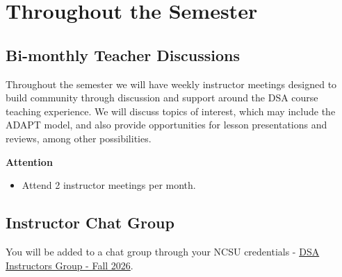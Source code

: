 \documentclass[
  letterpaper,
  DIV=11,
  numbers=noendperiod]{scrreprt}
\providecommand{\tightlist}{%
  \setlength{\itemsep}{0pt}\setlength{\parskip}{0pt}}
\begin{document}
\section{Throughout the Semester}\label{throughout-the-semester}

\subsection{Bi-monthly Teacher
Discussions}\label{bi-monthly-teacher-discussions}

Throughout the semester we will have weekly instructor meetings designed
to build community through discussion and support around the DSA course
teaching experience. We will discuss topics of interest, which may
include the ADAPT model, and also provide opportunities for lesson
presentations and reviews, among other possibilities.

\begin{tcolorbox}[enhanced jigsaw, toprule=.15mm, colback=white, arc=.35mm, colframe=quarto-callout-note-color-frame, bottomrule=.15mm, rightrule=.15mm, breakable, leftrule=.75mm, left=2mm, opacityback=0]
\begin{minipage}[t]{5.5mm}
\textcolor{quarto-callout-note-color}{\faInfo}
\end{minipage}%
\begin{minipage}[t]{\textwidth - 5.5mm}

\vspace{-3mm}\textbf{{Attention}}\vspace{3mm}

\begin{itemize}
\tightlist
\item
  {Attend 2 instructor meetings per month.}
\end{itemize}

\end{minipage}%
\end{tcolorbox}

\subsection{Instructor Chat Group}\label{instructor-chat-group}

You will be added to a chat group through your NCSU credentials -
\href{https://chat.google.com/room/AAQAdfaHlRc?cls=7}{DSA Instructors
Group - Fall 2026}.
\end{document}
